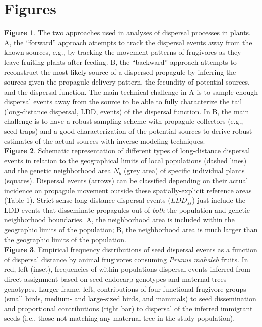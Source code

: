 \documentclass[a4paper, 12pt]{article}
\begin{document}
\section*{Figures}
\begin{linenumbers}

\textbf{Figure 1}. The two approaches used in analyses of dispersal processes in plants. A, the “forward” approach attempts to track the dispersal events away from the known sources, e.g., by tracking the movement patterns of frugivores as they leave fruiting plants after feeding. B, the “backward” approach  attempts to reconstruct the most likely source of a dispersed propagule by inferring the sources given the propagule delivery pattern, the fecundity of potential sources, and the dispersal function. The main technical challenge in A is to sample enough dispersal events away from the source to be able to fully characterize the tail (long-distance dispersal, LDD, events) of the dispersal function. In B, the main challenge is to have a robust sampling scheme with propagule collectors (e.g., seed traps) and a good characterization of the potential sources to derive robust estimates of the actual sources with inverse-modeling techniques.\\
 
\textbf{Figure 2}. Schematic representation of different types of long-distance dispersal events in relation to the geographical limits of local populations (dashed lines) and the genetic neighborhood area $N_b$ (grey area) of specific individual plants (squares). Dispersal events (arrows) can be classified depending on their actual incidence on propagule movement outside these spatially-explicit reference areas (Table 1). Strict-sense long-distance dispersal events ($LDD_{ss}$) just include the LDD events that disseminate propagules out of \textit{both} the population and genetic neighborhood boundaries. A, the neighborhood area is included within the geographic limits of the population; B, the neighborhood area is much larger than the geographic limits of the population.\\
 
\textbf{Figure 3}. Empirical frequency distributions of seed dispersal events as a function of dispersal distance by animal frugivores consuming \textit{Prunus mahaleb} fruits. In red, left (inset), frequencies of within-populations dispersal events inferred from direct assignment based on seed endocarp genotypes and maternal trees genotypes. Larger frame, left, contributions of four functional frugivore groups (small birds, medium- and large-sized birds, and mammals) to seed dissemination and proportional contributions (right bar) to dispersal of the inferred immigrant seeds (i.e., those not matching any maternal tree in the study population).\\
 

\end{linenumbers}
\end{document}
